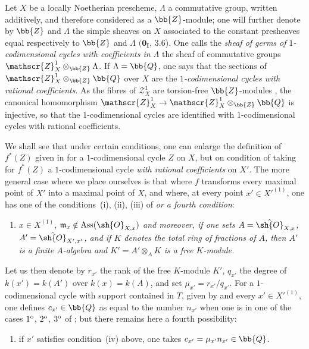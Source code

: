 
\begin{env}[21.10.9]
\label{IV.21.10.9}
Let $X$ be a locally Noetherian prescheme, $\Lambda$ a commutative group, written additively, and therefore considered as a $\bb{Z}$-module;
one will further denote by $\bb{Z}$ and $\Lambda$ the simple sheaves on $X$ associated to the constant presheaves equal respectively to $\bb{Z}$ and $\Lambda$ $(\mathbf{0_I}$, 3.6).
One calls the \emph{sheaf of germs of $1$-codimensional cycles with coefficients in $\Lambda$} the sheaf of commutative groups $\mathscr{Z}_X^1\otimes_{\bb{Z}}\Lambda$.
If $\Lambda=\bb{Q}$, one says that the sections of $\mathscr{Z}_X^1\otimes_{\bb{Z}}\bb{Q}$ over $X$ are the \emph{$1$-codimensional cycles with rational coefficients}.
As the fibres of $\mathscr{Z}_X^1$ are torsion-free $\bb{Z}$-modules , the canonical homomorphism $\mathscr{Z}_X^1\to\mathscr{Z}_X^1\otimes_{\bb{Z}}\bb{Q}$ is injective, so that the $1$-codimensional cycles are identified with $1$-codimensional cycles with rational coefficients.
\end{env}


\begin{env}[21.10.10]
\label{IV.21.10.10}
We shall see that under certain conditions, one can enlarge the definition of $f^*(Z)$ given in  for a $1$-codimensional cycle $Z$ on $X$, but on condition of taking for $f^*(Z)$ a $1$-codimensional cycle \emph{with rational coefficients} on $X'$.
The more general case where we place ourselves is that where $f$ transforms every maximal point of $X'$ into a maximal point of $X$, and where, at every point $x'\in X'^{(1)}$, one has one of the conditions~(i), (ii), (iii) of  \emph{or a fourth condition}:
\begin{enumerate}
  \item[(iv)] $x\in X^{(1)}$, $\mathfrak{m}_x\notin\operatorname{Ass}(\sh{O}_{X,x})$ \emph{and moreover, if one sets $A=\hat{\sh{O}}_{X,x}$, $A'=\hat{\sh{O}}_{X',x'}$, and if $K$ denotes the total ring of fractions of $A$, then $A'$ is a finite $A$-algebra and $K'=A'\otimes_A K$ is a free $K$-module.}
\end{enumerate}
Let us then denote by $r_{x'}$ the rank of the free $K$-module $K'$, $q_{x'}$ the degree of $k(x')=k(A')$ over $k(x)=k(A)$, and set $\mu_{x'}=r_{x'}/q_{x'}$.
For a $1$-codimensional cycle with support contained in $T$, given by  and every $x'\in X'^{(1)}$, one defines $c_{x'}\in\bb{Q}$ as equal to the number $n_{x'}$ when one is in one of the cases $1\textsuperscript{o}$, $2\textsuperscript{o}$, $3\textsuperscript{o}$ of ;
but there remains here a fourth possibility:
\begin{enumerate}
  \item[$4\textsuperscript{o}$] if $x'$ satisfies condition~(iv) above, one takes $c_{x'}=\mu_{x'}n_{x'}\in\bb{Q}$.
\end{enumerate}
\end{env}

